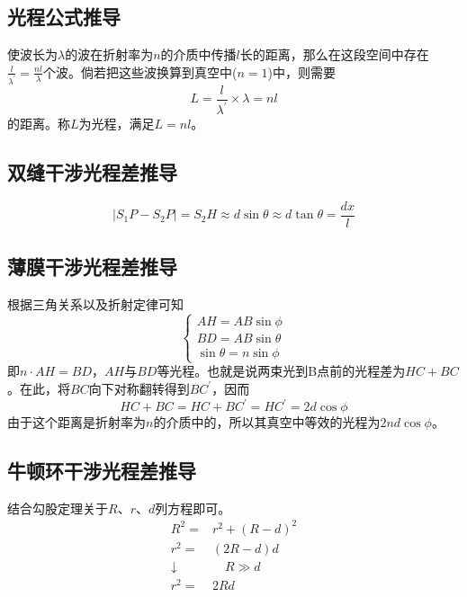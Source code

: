 \subsection{光程公式推导}

使波长为$\lambda$的波在折射率为$n$的介质中传播$l$长的距离，那么在这段空间中存在$\frac{l}{\lambda^\prime}=\frac{nl}{\lambda}$个波。倘若把这些波换算到真空中($n=1$)中，则需要
\begin{equation*}
    L=\frac{l}{\lambda^\prime}\times\lambda=nl
\end{equation*}
的距离。称$L$为光程，满足$L=nl$。

\subsection{双缝干涉光程差推导}

\begin{equation*}
    |S_1P-S_2P|=S_2H\approx d\sin\theta\approx d\tan\theta=\frac{dx}{l}
\end{equation*}

\subsection{薄膜干涉光程差推导}

根据三角关系以及折射定律可知
\begin{equation*}
    \begin{cases}
        AH=AB\sin\phi\\
        BD=AB\sin\theta\\
        \sin\theta=n\sin\phi
    \end{cases}
\end{equation*}
即$n\cdot AH=BD$，$AH$与$BD$等光程。也就是说两束光到B点前的光程差为$HC+BC$。在此，将$BC$向下对称翻转得到$BC^\prime$，因而
\begin{equation*}
    HC+BC=HC+BC^\prime=HC^\prime=2d\cos\phi
\end{equation*}
由于这个距离是折射率为$n$的介质中的，所以其真空中等效的光程为$2nd\cos\phi$。

\subsection{牛顿环干涉光程差推导}

结合勾股定理关于$R$、$r$、$d$列方程即可。
\begin{align*}
    R^2=&r^2+(R-d)^2\\
    r^2=&(2R-d)d\\
    \downarrow&\quad R\gg d\\
    r^2=&2Rd
\end{align*}

